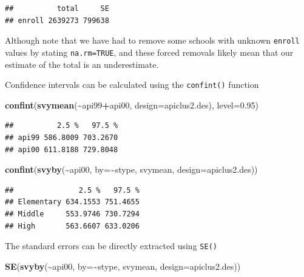\documentclass[
]{book}
\newenvironment{Shaded}{\begin{snugshade}}{\end{snugshade}}
\newcommand{\AttributeTok}[1]{\textcolor[rgb]{0.13,0.29,0.53}{#1}}
\newcommand{\FloatTok}[1]{\textcolor[rgb]{0.00,0.00,0.81}{#1}}
\newcommand{\FunctionTok}[1]{\textcolor[rgb]{0.13,0.29,0.53}{\textbf{#1}}}
\newcommand{\NormalTok}[1]{#1}
\newcommand{\SpecialCharTok}[1]{\textcolor[rgb]{0.81,0.36,0.00}{\textbf{#1}}}
\begin{document}
\begin{verbatim}
##          total     SE
## enroll 2639273 799638
\end{verbatim}

Although note that we have had to remove some schools with unknown
\texttt{enroll} values by stating \texttt{na.rm=TRUE}, and these forced removals likely mean
that our estimate of the total is an underestimate.

Confidence intervals can be calculated using the \texttt{confint()} function

\begin{Shaded}
\begin{Highlighting}[]
\FunctionTok{confint}\NormalTok{(}\FunctionTok{svymean}\NormalTok{(}\SpecialCharTok{\textasciitilde{}}\NormalTok{api99}\SpecialCharTok{+}\NormalTok{api00, }\AttributeTok{design=}\NormalTok{apiclus2.des), }\AttributeTok{level=}\FloatTok{0.95}\NormalTok{)}
\end{Highlighting}
\end{Shaded}

\begin{verbatim}
##          2.5 %   97.5 %
## api99 586.8009 703.2670
## api00 611.8188 729.8048
\end{verbatim}

\begin{Shaded}
\begin{Highlighting}[]
\FunctionTok{confint}\NormalTok{(}\FunctionTok{svyby}\NormalTok{(}\SpecialCharTok{\textasciitilde{}}\NormalTok{api00, }\AttributeTok{by=}\SpecialCharTok{\textasciitilde{}}\NormalTok{stype, svymean, }\AttributeTok{design=}\NormalTok{apiclus2.des))}
\end{Highlighting}
\end{Shaded}

\begin{verbatim}
##               2.5 %   97.5 %
## Elementary 634.1553 751.4655
## Middle     553.9746 730.7294
## High       563.6607 633.0206
\end{verbatim}

The standard errors can be directly extracted using \texttt{SE()}

\begin{Shaded}
\begin{Highlighting}[]
\FunctionTok{SE}\NormalTok{(}\FunctionTok{svyby}\NormalTok{(}\SpecialCharTok{\textasciitilde{}}\NormalTok{api00, }\AttributeTok{by=}\SpecialCharTok{\textasciitilde{}}\NormalTok{stype, svymean, }\AttributeTok{design=}\NormalTok{apiclus2.des))}
\end{Highlighting}
\end{Shaded}
\end{document}
